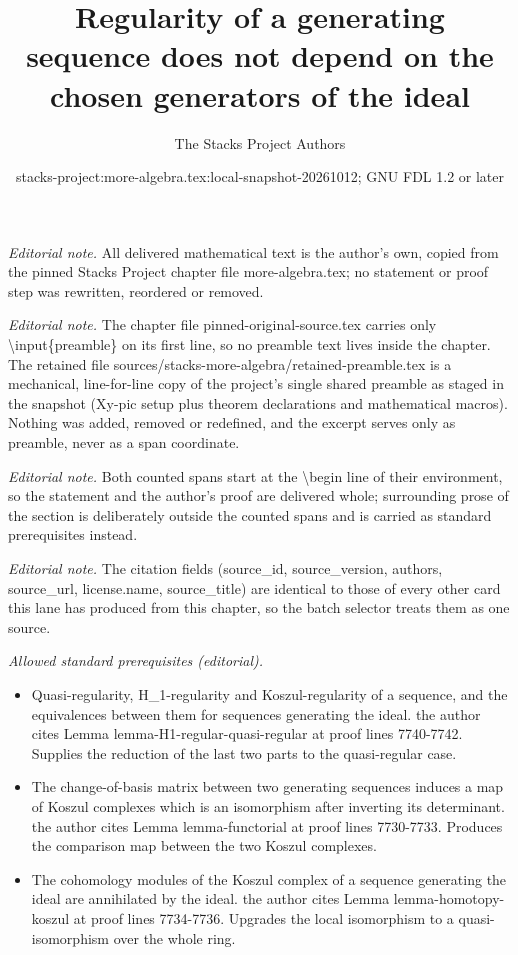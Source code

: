 \documentclass[10pt,a4paper]{amsart}
\title{Regularity of a generating sequence does not depend on the chosen generators of the ideal}
\author{The Stacks Project Authors}
\date{stacks-project:more-algebra.tex:local-snapshot-20261012; GNU FDL 1.2 or later}
\theoremstyle{plain}
\theoremstyle{definition}
\theoremstyle{remark}
\numberwithin{equation}{subsection}
\begin{document}
\maketitle
\setcounter{subsection}{1}
\noindent\textit{Editorial note.} All delivered mathematical text is the author's own, copied from the pinned Stacks Project chapter file more-algebra.tex; no statement or proof step was rewritten, reordered or removed.\par\medskip
\noindent\textit{Editorial note.} The chapter file pinned-original-source.tex carries only \textbackslash{}input\{preamble\} on its first line, so no preamble text lives inside the chapter. The retained file sources/stacks-more-algebra/retained-preamble.tex is a mechanical, line-for-line copy of the project's single shared preamble as staged in the snapshot (Xy-pic setup plus theorem declarations and mathematical macros). Nothing was added, removed or redefined, and the excerpt serves only as preamble, never as a span coordinate.\par\medskip
\noindent\textit{Editorial note.} Both counted spans start at the \textbackslash{}begin line of their environment, so the statement and the author's proof are delivered whole; surrounding prose of the section is deliberately outside the counted spans and is carried as standard prerequisites instead.\par\medskip
\noindent\textit{Editorial note.} The citation fields (source\_id, source\_version, authors, source\_url, license.name, source\_title) are identical to those of every other card this lane has produced from this chapter, so the batch selector treats them as one source.\par\medskip
\noindent\textit{Allowed standard prerequisites (editorial).}\begin{itemize}
\item Quasi-regularity, H\_1-regularity and Koszul-regularity of a sequence, and the equivalences between them for sequences generating the ideal. the author cites Lemma lemma-H1-regular-quasi-regular at proof lines 7740-7742. Supplies the reduction of the last two parts to the quasi-regular case.
\item The change-of-basis matrix between two generating sequences induces a map of Koszul complexes which is an isomorphism after inverting its determinant. the author cites Lemma lemma-functorial at proof lines 7730-7733. Produces the comparison map between the two Koszul complexes.
\item The cohomology modules of the Koszul complex of a sequence generating the ideal are annihilated by the ideal. the author cites Lemma lemma-homotopy-koszul at proof lines 7734-7736. Upgrades the local isomorphism to a quasi-isomorphism over the whole ring.
\end{itemize}\medskip
\end{document}
